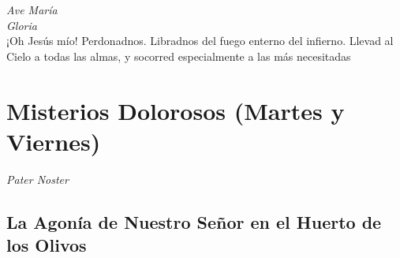 \documentclass[a4paper,11pt, oneside]{report}
\begin{document}
      \textit{Ave María} \\
      \indent\textit{Gloria} \\
      \indent¡Oh Jesús mío! Perdonadnos. Libradnos del fuego enterno del infierno. Llevad al Cielo a todas las almas, y socorred especialmente a las más 
      necesitadas
        
  \section*{ Misterios Dolorosos (Martes y Viernes)}
    
  \textit{Pater Noster}

    \subsection*{ La Agonía de Nuestro Señor en el Huerto de los Olivos }
      
\end{document}
